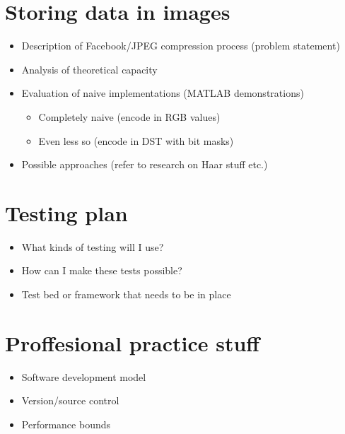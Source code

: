 \section{Storing data in images}
    \begin{itemize}
	\item Description of Facebook/JPEG compression process (problem statement)
	\item Analysis of theoretical capacity
	\item Evaluation of naive implementations (MATLAB demonstrations)
            \begin{itemize}
		\item Completely naive (encode in RGB values)
		\item Even less so (encode in DST with bit masks)
             \end{itemize}
	\item Possible approaches (refer to research on Haar stuff etc.)
    \end{itemize}

\section{Testing plan}
    \begin{itemize}
	\item What kinds of testing will I use?
	\item How can I make these tests possible?
	\item Test bed or framework that needs to be in place
    \end{itemize}
    
    
\section{Proffesional practice stuff}
    \begin{itemize}
	\item Software development model
	\item Version/source control
	\item Performance bounds
    \end{itemize}
    
    
